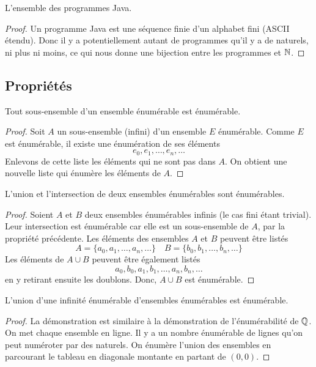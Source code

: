  \begin{myexem}
 \label{exem:programme_java}
  L'ensemble des programmes Java.
  \begin{proof}
   Un programme Java est une séquence finie d'un alphabet fini (ASCII étendu). Donc il y a potentiellement autant de programmes qu'il y a de naturels, ni plus ni moins, ce qui nous donne une bijection entre les programmes et $\mathbb{N}$.
  \end{proof}
\end{myexem}

\subsection{Propriétés}
\label{subsec:proprietes}

\begin{myprop}
	Tout sous-ensemble d'un ensemble énumérable est énumérable.
	\begin{proof}
Soit $A$ un sous-ensemble (infini) d'un ensemble $E$ énumérable. Comme $E$ est énumérable, il existe une énumération de ses éléments
\[
e_0, e_1, \ldots , e_n, \ldots
\]
Enlevons de cette liste les éléments qui ne sont pas dans $A$. On obtient une nouvelle liste qui énumère les éléments de $A$.
	\end{proof}
\end{myprop}

\begin{myprop}
	L'union et l'intersection de deux ensembles énumérables sont énumérables.
	\begin{proof}
		Soient $A$ et $B$ deux ensembles énumérables infinis (le cas fini étant trivial). Leur intersection est énumérable car elle est un sous-ensemble de $A$, par la propriété précédente. Les éléments des ensembles $A$ et $B$ peuvent être listés
\[
A = \{ a_0, a_1, \ldots , a_n, \ldots\}  \quad
B = \{ b_0, b_1, \ldots , b_n, \ldots\}
\]
Les éléments de $A \cup B$ peuvent être également listés
\[
a_0, b_0, a_1, b_1, \ldots, a_n, b_n, \ldots
\]
en y retirant ensuite les doublons. Donc, $A \cup B$ est énumérable.
	\end{proof}
\end{myprop}

\begin{myprop}
	L'union d'une infinité énumérable d'ensembles énumérables est énumérable.
    \begin{proof}
      La démonstration est similaire à la démonstration de l'énumérabilité de $\mathbb{Q}$.
      On met chaque ensemble en ligne. Il y a un nombre énumérable de lignes qu'on peut numéroter par des naturels.
      On énumère l'union des ensembles en parcourant le tableau en diagonale montante en partant de $(0,0)$.
    \end{proof}
\end{myprop}

